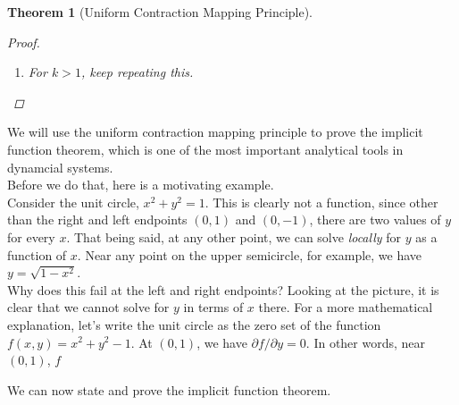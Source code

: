 \documentclass{article}
\newtheorem{theorem}{Theorem}[section]
\begin{document}
\begin{theorem}[Uniform Contraction Mapping Principle]
\begin{proof}
\begin{enumerate}
By the Uniform Contraction Mapping Principle, for each $\mu \in D$ there a unique fixed point $Z(\mu)$ of $\Phi$. Since $F$ is $C^1$, $\Phi$ is continuous, thus the map $Z(\mu)$ is continuous.\\

The only thing that remains is to show that $DG(\mu)$ actually exists and is equal to $Z(\mu)$. This is rather technical, so it will be omitted for now. (References will be provided at some point.)

\item For $k > 1$, keep repeating this.

\end{enumerate}

\end{proof}
\end{theorem}

We will use the uniform contraction mapping principle to prove the implicit function theorem, which is one of the most important analytical tools in dynamcial systems.\\

Before we do that, here is a motivating example.\\

Consider the unit circle, $x^2 + y^2 = 1$. This is clearly not a function, since other than the right and left endpoints $(0, 1)$ and $(0, -1)$, there are two values of $y$ for every $x$. That being said, at any other point, we can solve \emph{locally} for $y$ as a function of $x$. Near any point on the upper semicircle, for example, we have $y = \sqrt{1 - x^2}$. \\

Why does this fail at the left and right endpoints? Looking at the picture, it is clear that we cannot solve for $y$ in terms of $x$ there. For a more mathematical explanation, let's write the unit circle as the zero set of the function $f(x, y) = x^2 + y^2 - 1$. At $(0, 1)$, we have $\partial f / \partial y = 0$. In other words, near $(0, 1)$, $f$

We can now state and prove the implicit function theorem.
\end{document}
